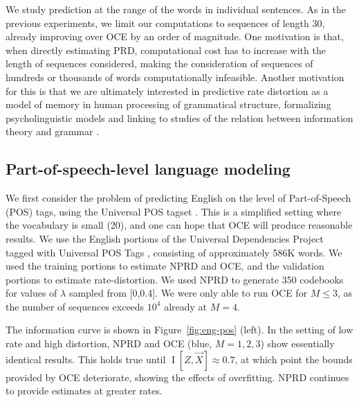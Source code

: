 \documentclass[11pt,letterpaper]{article}
\begin{document}

We study prediction at the range of the words in individual sentences.
As in the previous experiments, we limit our computations to sequences of length 30, already improving over OCE by an order of magnitude.
One motivation is that, when directly estimating PRD, computational cost has to increase with the length of sequences considered, making the consideration of sequences of hundreds or thousands of words computationally infeasible.
Another motivation for this is that we are ultimately interested in predictive rate distortion as a model of memory in human processing of grammatical structure, formalizing psycholinguistic models \citep{gibson-linguistic-1998,futrell-noisy-context-2017} and linking to studies of the relation between information theory and grammar \citep{koplenig2017statistical}.





\subsection{Part-of-speech-level language modeling}\label{sec:pos}

We first consider the problem of predicting English on the level of Part-of-Speech (POS) tags, using the Universal POS tagset \citep{petrov-universal-2012}. 
This is a simplified setting where the vocabulary is small (20), and one can hope that OCE will produce reasonable results.
We use the English portions of the Universal Dependencies Project~\citep{nivre-universal-2017} tagged with Universal POS Tags \citep{petrov-universal-2012}, consisting of approximately 586K words.
We used the training portions to estimate NPRD and OCE, and the validation portions to estimate rate-distortion.
We used NPRD to generate 350 codebooks for values of $\lambda$ sampled from [0,0.4].
We were only able to run OCE for $M \leq 3$, as the number of sequences exceeds $10^4$ already at $M=4$.


The information curve is shown in Figure~\ref{fig:eng-pos} (left).
In the setting of low rate and high distortion, NPRD and OCE (blue, $M=1,2,3$) show essentially identical results.
This holds true until $\operatorname{I}[Z, \overrightarrow{X}] \approx 0.7$, at which point the bounds provided by OCE deteriorate, showing the effects of overfitting.
NPRD continues to provide estimates at greater rates.
\end{document}
